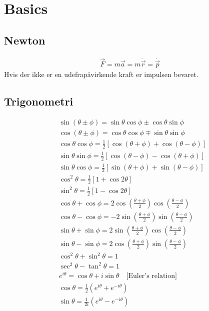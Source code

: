\documentclass[a4paper,oneside,article]{memoir}
\begin{document}
\chapter{Basics}
\section{Newton}
\begin{align*}
    \vec{F} = m\vec{a} = m\ddot{\vec{r}}=\dot{\vec{p}}
\end{align*}
Hvis der ikke er en udefrapåvirkende kraft er impulsen bevaret. 

\section{Trigonometri}
\begin{align*}
    &\sin(\theta \pm \phi) = \sin \theta \cos \phi \pm \cos \theta \sin \phi \\
    &\cos(\theta \pm \phi) = \cos \theta \cos \phi \mp \sin \theta \sin \phi \\
    &\cos \theta \cos \phi = \frac{1}{2} \left[\cos(\theta + \phi) + \cos(\theta - \phi)\right] \\
    &\sin \theta \sin \phi = \frac{1}{2} \left[\cos(\theta - \phi) - \cos(\theta + \phi)\right] \\
    &\sin \theta \cos \phi = \frac{1}{2} [\sin(\theta + \phi) + \sin(\theta - \phi)] \\
    &\cos^2 \theta = \frac{1}{2} [1 + \cos 2\theta] \\
    &\sin^2 \theta = \frac{1}{2} [1 - \cos 2\theta] \\
    &\cos \theta + \cos \phi = 2 \cos \left( \frac{\theta + \phi}{2} \right) \cos \left( \frac{\theta - \phi}{2} \right) \\
    &\cos \theta - \cos \phi = -2 \sin \left( \frac{\theta + \phi}{2} \right) \sin \left( \frac{\theta - \phi}{2} \right) \\
    &\sin \theta + \sin \phi = 2 \sin \left( \frac{\theta + \phi}{2} \right) \cos \left( \frac{\theta - \phi}{2} \right) \\
    &\sin \theta - \sin \phi = 2 \cos \left( \frac{\theta + \phi}{2} \right) \sin \left( \frac{\theta - \phi}{2} \right) \\
    &\cos^2 \theta + \sin^2 \theta = 1\\
    &\sec^2 \theta - \tan^2 \theta = 1\\
    &e^{i \theta} = \cos \theta + i \sin \theta \quad \text{[Euler's relation]} \\
    &\cos \theta = \frac{1}{2} \left( e^{i \theta} + e^{-i \theta} \right) \\
    &\sin \theta = \frac{1}{2i} \left( e^{i \theta} - e^{-i \theta} \right)
\end{align*}
\end{document}
